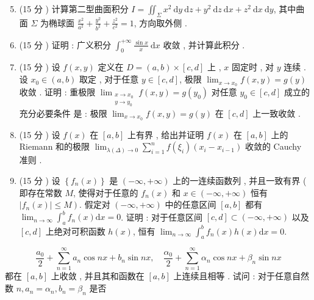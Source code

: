 \documentclass[10pt]{article}
\begin{document}
\begin{enumerate}
  \setcounter{enumi}{4}
  \item (15  分 )  计算第二型曲面积分  $I=\iint_{\Sigma} x^{2} \mathrm{~d} y \mathrm{~d} z+y^{2} \mathrm{~d} z \mathrm{~d} x+z^{2} \mathrm{~d} x \mathrm{~d} y$,  其中曲面  $\Sigma$  为椭球面  $\frac{x^{2}}{a^{2}}+\frac{y^{2}}{b^{2}}+\frac{z^{2}}{c^{2}}=1$,  方向取外侧 .

  \item (15  分 )  证明 :  广义积分  $\int_{0}^{+\infty} \frac{\sin x}{x} \mathrm{~d} x$  收敛 ,  并计算此积分 .

  \item (15  分 )  设  $f(x, y)$  定义在  $D=(a, b) \times[c, d]$  上 , $x$  固定时 ,  对  $y$  连续 .  设  $x_{0} \in(a, b)$  取定 ,  对于任意  $y \in[c, d]$,  极限  $\lim _{x \rightarrow x_{0}} f(x, y)=g(y)$  收敛 .  证明 :  重极限  $\lim _{\substack{x \rightarrow x_{0} \\ y \rightarrow y_{0}}} f(x, y)=g\left(y_{0}\right)$  对任意  $y_{0} \in[c, d]$  成立的充分必要条件   是 :  极限  $\lim _{x \rightarrow x_{0}} f(x, y)=g(y)$  在  $[c, d]$  上一致收敛 .

  \item (15  分 )  设  $f(x)$  在  $[a, b]$  上有界 ,  给出并证明  $f(x)$  在  $[a, b]$  上的  Riemann  和的极限  $\lim _{\lambda(\Delta) \rightarrow 0} \sum_{i=1}^{n} f\left(\xi_{i}\right)\left(x_{i}-x_{i-1}\right)$  收敛的  Cauchy  准则 .

  \item (15  分 )  设  $\left\{f_{n}(x)\right\}$  是  $(-\infty,+\infty)$  上的一连续函数列 ,  并且一致有界  ( 即存在常数  $M$,  使得对于任意的  $f_{n}(x)$  和  $x \in(-\infty,+\infty)$  恒有  $\left.\left|f_{n}(x)\right| \leqslant M\right)$.  假定对  $(-\infty,+\infty)$  中的任意区间  $[a, b]$  都有  $\lim _{n \rightarrow \infty} \int_{a}^{b} f_{n}(x) \mathrm{d} x=0$.  证明 :  对于任意区间  $[c, d] \subset(-\infty,+\infty)$  以及  $[c, d]$  上绝对可积函数  $h(x)$,  恒有  $\lim _{n \rightarrow \infty} \int_{a}^{b} f_{n}(x) h(x) \mathrm{d} x=0$.

\end{enumerate}
$$
\frac{a_{0}}{2}+\sum_{n=1}^{\infty} a_{n} \cos n x+b_{n} \sin n x, \quad \frac{\alpha_{0}}{2}+\sum_{n=1}^{\infty} \alpha_{n} \cos n x+\beta_{n} \sin n x
$$
 都在  $[a, b]$  上收敛 ,  并且其和函数在  $[a, b]$  上连续且相等 .  试问 :  对于任意自然数  $n, a_{n}=\alpha_{n}, b_{n}=\beta_{n}$  是否 
\end{document}
